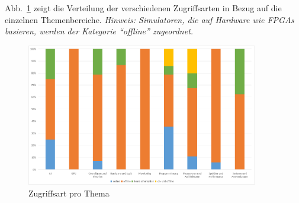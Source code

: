 Abb.~\ref{fig:13-zugriff-thema} zeigt die Verteilung der verschiedenen Zugriffsarten in Bezug auf die einzelnen Themenbereiche. \textit{Hinweis: Simulatoren, die auf Hardware wie \ac{FPGA}s basieren, werden der Kategorie \enquote{offline} zugeordnet.}

\begin{figure}[!htbp]
    \centering
    \caption{Zugriffsart pro Thema}
    \label{fig:13-zugriff-thema}
    \includegraphics[width=0.90\textwidth]{graphics/13-zugriff-thema.png}
\end{figure}

